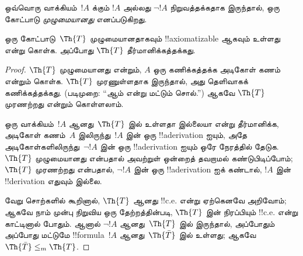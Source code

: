 \documentclass[../../../include/open-logic-section]{subfiles}
\begin{document}



ஒவ்வொரு வாக்கியம்~$!A$ க்கும் $!A$ அல்லது $\lnot !A$
நிறுவத்தக்கதாக இருந்தால், ஒரு கோட்பாடு {\em முழுமையானது} எனப்படுகிறது.

\begin{lem}
ஒரு கோட்பாடு~$\Th{T}$ முழுமையானதாகவும் !!{axiomatizable} ஆகவும் உள்ளது
என்று கொள்க. அப்போது $\Th{T}$ தீர்மானிக்கத்தக்கது.
\end{lem}

\begin{proof}
$\Th{T}$ முழுமையானது என்றும், $A$ ஒரு கணிக்கத்தக்க அடிகோள் கணம் என்றும்
கொள்க. $\Th{T}$ முரணுள்ளதாக இருந்தால், அது தெளிவாகக் கணிக்கத்தக்கது.
(படிமுறை: “ஆம் என்று மட்டும் சொல்.”) ஆகவே $\Th{T}$ முரணற்றது என்றும்
கொள்ளலாம்.

ஒரு வாக்கியம்~$!A$ ஆனது~$\Th{T}$ இல் உள்ளதா இல்லையா என்று
தீர்மானிக்க,
அடிகோள் கணம்~$A$ இலிருந்து~$!A$ இன் ஒரு !!a{derivation} ஐயும்,
அதே அடிகோள்களிலிருந்து~$\lnot !A$ இன் ஒரு !!a{derivation} ஐயும் ஒரே நேரத்தில்
தேடுக. $\Th{T}$ முழுமையானது என்பதால் அவற்றுள் ஒன்றைத் தவறாமல்
கண்டுபிடிப்போம்; $\Th{T}$ முரணற்றது என்பதால், $\lnot !A$ இன் ஒரு
!!a{derivation} ஐக் கண்டால், $!A$ இன் !!{derivation} எதுவும் இல்லை.

வேறு சொற்களில் கூறினால், $\Th{T}$ ஆனது !!{c.e.} என்று ஏற்கெனவே அறிவோம்;
ஆகவே நாம் முன்பு நிறுவிய ஒரு தேற்றத்தின்படி,
$\Th{T}$ இன் நிரப்பியும் !!{c.e.} என்று காட்டினால் போதும். ஆனால்
$\lnot !A$ ஆனது~$\Th{T}$ இல் இருந்தால், அப்போதும் அப்போது மட்டுமே
!!{formula}~$!A$ ஆனது~$\Th{\bar T}$ இல் உள்ளது; ஆகவே
$\Th{\bar T} \leq_m \Th{T}$.
\end{proof}
\end{document}
